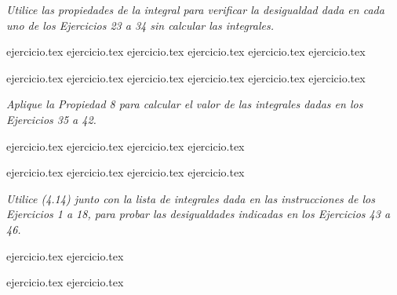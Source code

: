 \vspace{1em}
\noindent \textit{Utilice las propiedades de la integral para verificar la desigualdad dada en cada uno de los Ejercicios 23 a 34 sin calcular las integrales.}

\begin{enumerate}
    \setcounter{enumi}{22}
    \begin{minipage}{0.45\textwidth}
    {ejercicio.tex}
    {ejercicio.tex}
    {ejercicio.tex}
    {ejercicio.tex}
    {ejercicio.tex}
    {ejercicio.tex}
    \end{minipage}%
    \begin{minipage}{0.45\textwidth}
    {ejercicio.tex}
    {ejercicio.tex}
    {ejercicio.tex}
    {ejercicio.tex}
    {ejercicio.tex}
    {ejercicio.tex}
    \end{minipage}
\end{enumerate}

\vspace{1em}
\noindent \textit{Aplique la Propiedad 8 para calcular el valor de las integrales dadas en los Ejercicios 35 a 42.}

\begin{enumerate}
    \setcounter{enumi}{34}
    \begin{minipage}{0.45\textwidth}
    {ejercicio.tex}
    {ejercicio.tex}
    {ejercicio.tex}
    {ejercicio.tex}
    \end{minipage}%
    \begin{minipage}{0.45\textwidth}
    {ejercicio.tex}
    {ejercicio.tex}
    {ejercicio.tex}
    {ejercicio.tex}
    \end{minipage}
\end{enumerate}

\vspace{1em}
\noindent \textit{Utilice (4.14) junto con la lista de integrales dada en las instrucciones de los Ejercicios 1 a 18, para probar las desigualdades indicadas en los Ejercicios 43 a 46.}

\begin{enumerate}
    \setcounter{enumi}{42}
    \begin{minipage}{0.45\textwidth}
    {ejercicio.tex}
    {ejercicio.tex}
    \end{minipage}%
    \begin{minipage}{0.45\textwidth}
    {ejercicio.tex}
    {ejercicio.tex}
    \end{minipage}
\end{enumerate}

